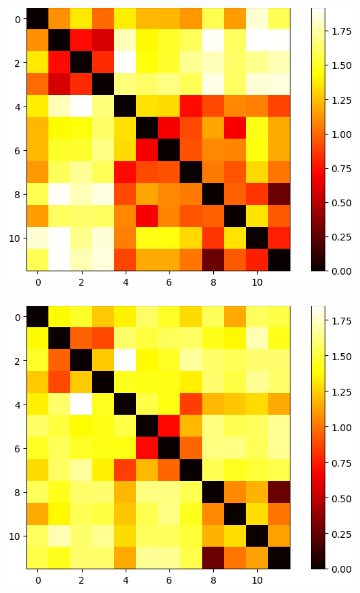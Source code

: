 \begin{figure}
    \centering
    \begin{subfigure}{0.48\textwidth}
        \includegraphics[width=\linewidth]{figures/syntetic_data/distance_matrix/SO3_signature_3.png}
        \caption{}
        \label{fig:classification-signature-level3-SO3}
    \end{subfigure}
    \hfill
    \begin{subfigure}{0.48\textwidth}
        \includegraphics[width=\linewidth]{figures/syntetic_data/distance_matrix/SO3_signature_5.png}
        \caption{}
        \label{fig:classification-signature-level5-SO3}

\end{subfigure}
\end{figure}
